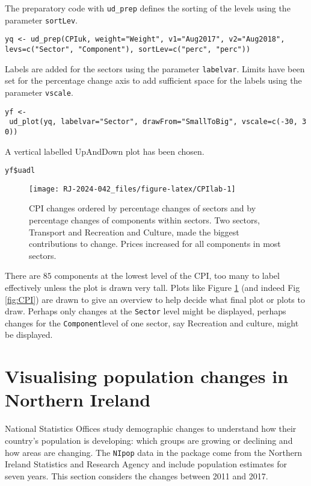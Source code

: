 The preparatory code with \texttt{ud\_prep} defines the sorting of the levels using the parameter \texttt{sortLev}.

\texttt{yq\ \textless{}-\ ud\_prep(CPIuk,\ weight="Weight",\ v1="Aug2017",\ v2="Aug2018",} \texttt{levs=c("Sector",\ "Component"),\ sortLev=c("perc",\ "perc"))}

Labels are added for the sectors using the parameter \texttt{labelvar}. Limits have been set for the percentage change axis to add sufficient space for the labels using the parameter \texttt{vscale}.

\texttt{yf\ \textless{}-\ ud\_plot(yq,\ labelvar="Sector",\ drawFrom="SmallToBig",\ vscale=c(-30,\ 30))}

A vertical labelled UpAndDown plot has been chosen.

\texttt{yf\$uadl}

\begin{figure}

{\centering \texttt{[image: RJ-2024-042\_files/figure-latex/CPIlab-1]} 

}

\caption{CPI changes ordered by percentage changes of sectors and by percentage changes of components within sectors.  Two sectors, Transport and Recreation and Culture, made the biggest contributions to change.  Prices increased for all components in most sectors.}\label{fig:CPIlab}
\end{figure}

There are \(85\) components at the lowest level of the CPI, too many to label effectively unless the plot is drawn very tall. Plots like Figure \ref{fig:CPIlab} (and indeed Fig \ref{fig:CPI}) are drawn to give an overview to help decide what final plot or plots to draw. Perhaps only changes at the \texttt{Sector} level might be displayed, perhaps changes for the \texttt{Component}level of one sector, say Recreation and culture, might be displayed.

\hypertarget{visualising-population-changes-in-northern-ireland}{%
\section{Visualising population changes in Northern Ireland}\label{visualising-population-changes-in-northern-ireland}}

National Statistics Offices study demographic changes to understand how their country's population is developing: which groups are growing or declining and how areas are changing. The \texttt{NIpop} data in the package come from the Northern Ireland Statistics and Research Agency and include population estimates for seven years. This section considers the changes between 2011 and 2017.


